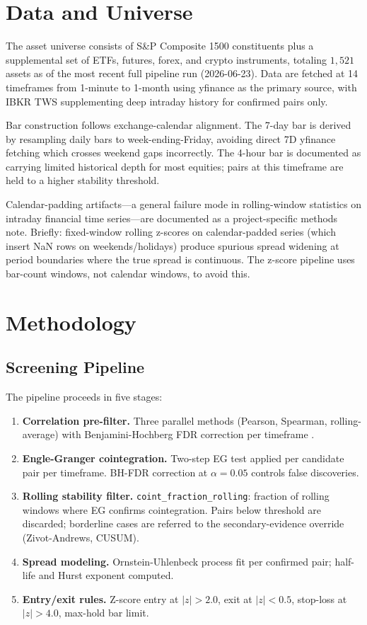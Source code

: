\documentclass[12pt,a4paper]{article}
\begin{document}
\section{Data and Universe}

The asset universe consists of S\&P Composite 1500 constituents plus a supplemental
set of ETFs, futures, forex, and crypto instruments, totaling $1{,}521$ assets as
of the most recent full pipeline run (2026-06-23). Data are fetched at 14 timeframes
from 1-minute to 1-month using yfinance as the primary source, with IBKR TWS
supplementing deep intraday history for confirmed pairs only.

Bar construction follows exchange-calendar alignment. The 7-day bar is derived by
resampling daily bars to week-ending-Friday, avoiding direct 7D yfinance fetching
which crosses weekend gaps incorrectly. The 4-hour bar is documented as carrying
limited historical depth for most equities; pairs at this timeframe are held to a
higher stability threshold.

Calendar-padding artifacts---a general failure mode in rolling-window statistics on
intraday financial time series---are documented as a project-specific methods note.
Briefly: fixed-window rolling z-scores on calendar-padded series (which insert NaN
rows on weekends/holidays) produce spurious spread widening at period boundaries
where the true spread is continuous. The z-score pipeline uses bar-count windows,
not calendar windows, to avoid this.

\section{Methodology}

\subsection{Screening Pipeline}

The pipeline proceeds in five stages:
\begin{enumerate}
  \item \textbf{Correlation pre-filter.} Three parallel methods
    (Pearson, Spearman, rolling-average) with Benjamini-Hochberg FDR correction
    per timeframe \citep{benjamini_hochberg1995}.
  \item \textbf{Engle-Granger cointegration.} Two-step EG test
    \citep{engle_granger1987} applied per candidate pair per timeframe.
    BH-FDR correction at $\alpha=0.05$ controls false discoveries.
  \item \textbf{Rolling stability filter.} \texttt{coint\_fraction\_rolling}:
    fraction of rolling windows where EG confirms cointegration. Pairs below
    threshold are discarded; borderline cases are referred to the secondary-evidence
    override (Zivot-Andrews, CUSUM).
  \item \textbf{Spread modeling.} Ornstein-Uhlenbeck process fit per confirmed
    pair; half-life and Hurst exponent computed.
  \item \textbf{Entry/exit rules.} Z-score entry at $|z| > 2.0$, exit at
    $|z| < 0.5$, stop-loss at $|z| > 4.0$, max-hold bar limit.
\end{enumerate}
\end{document}
